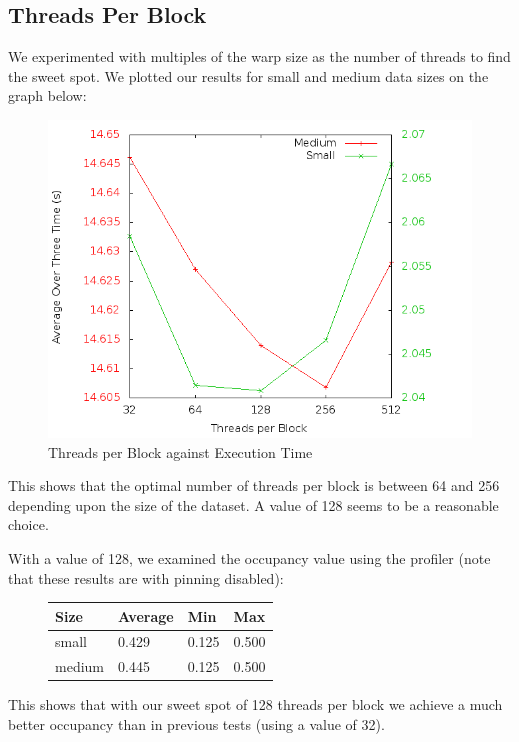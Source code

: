 \subsection*{Threads Per Block}
We experimented with multiples of the warp size as the number of threads to find the sweet spot. We plotted our results for small and medium data sizes on the graph below:

\begin{figure}[H]
  \centering
  \includegraphics[scale=0.3]{images/threadsperblock}
  \caption[threadsperblock]{Threads per Block against Execution Time}
  \label{fig:threadsperblock}
\end{figure}

This shows that the optimal number of threads per block is between 64 and 256 depending upon the size of the dataset. A value of 128 seems to be a reasonable choice.

With a value of 128, we examined the occupancy value using the profiler (note that these results are with pinning disabled):

\begin{figure}[H]\centering \begin{tabular}{ l | l | l | l}
\hline
Size & Average & Min & Max \\
\hline
\hline
small & 0.429 & 0.125 & 0.500 \\
medium & 0.445 & 0.125 & 0.500 \\
\hline
\end{tabular} \end{figure}

This shows that with our sweet spot of 128 threads per block we achieve a much better occupancy than in previous tests (using a value of 32). 